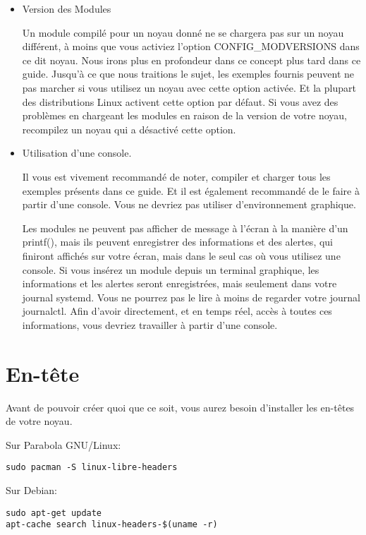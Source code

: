 \documentclass[11pt]{article}
\begin{document}
\begin{itemize}
\item Version des Modules
\label{sec-1-8-0-1}

Un module compilé pour un noyau donné ne se chargera pas sur un noyau différent, à moins que vous activiez l'option CONFIG\_MODVERSIONS dans ce dit noyau. Nous irons plus en profondeur dans ce concept plus tard dans ce guide. Jusqu'à ce que nous traitions le sujet, les exemples fournis peuvent ne pas marcher si vous utilisez un noyau avec cette option activée. Et la plupart des distributions Linux activent cette option par défaut. Si vous avez des problèmes en chargeant les modules en raison de la version de votre noyau, recompilez un noyau qui a désactivé cette option.

\item Utilisation d'une console.
\label{sec-1-8-0-2}

Il vous est vivement recommandé de noter, compiler et charger tous les exemples présents dans ce guide. Et il est également recommandé de le faire à partir d'une console. Vous ne devriez pas utiliser d'environnement graphique.

Les modules ne peuvent pas afficher de message à l'écran à la manière d'un printf(), mais ils peuvent enregistrer des informations et des alertes, qui finiront affichés sur votre écran, mais dans le seul cas où vous utilisez une console. Si vous insérez un module depuis un terminal graphique, les informations et les alertes seront enregistrées, mais seulement dans votre journal systemd. Vous ne pourrez pas le lire à moins de regarder votre journal journalctl. Afin d'avoir directement, et en temps réel, accès à toutes ces informations, vous devriez travailler à partir d'une console.
\end{itemize}

\section*{En-tête}
\label{sec-2}

Avant de pouvoir créer quoi que ce soit, vous aurez besoin d'installer les en-têtes de votre noyau.

Sur Parabola GNU/Linux:

\begin{verbatim}
sudo pacman -S linux-libre-headers
\end{verbatim}

Sur Debian:

\begin{verbatim}
sudo apt-get update
apt-cache search linux-headers-$(uname -r)
\end{verbatim}
\end{document}
